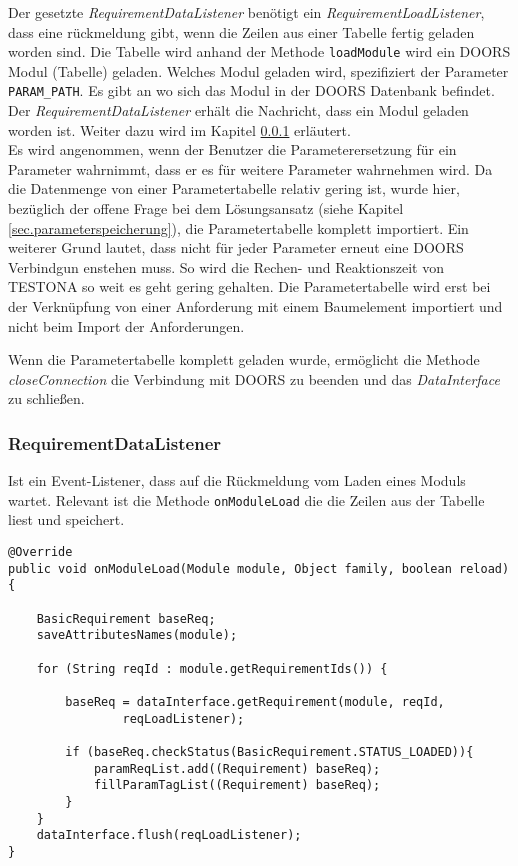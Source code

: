 Der gesetzte \textit{RequirementDataListener} benötigt ein \textit{RequirementLoadListener}, dass eine rückmeldung gibt, wenn die Zeilen aus einer Tabelle fertig geladen worden sind. Die Tabelle wird anhand der Methode \texttt{loadModule} wird ein DOORS Modul (Tabelle) geladen. Welches Modul geladen wird, spezifiziert der Parameter \texttt{PARAM\_PATH}. Es gibt an wo sich das Modul in der DOORS Datenbank befindet. Der \textit{RequirementDataListener} erhält die Nachricht, dass ein Modul geladen worden ist. Weiter dazu wird im Kapitel \ref{sub.RequirementDataListener} erläutert.\\


Es wird angenommen, wenn der Benutzer die Parameterersetzung für ein Parameter wahrnimmt, dass er es für weitere Parameter wahrnehmen wird. Da die Datenmenge von einer Parametertabelle relativ gering ist, wurde hier, bezüglich der offene Frage bei dem Lösungsansatz (siehe Kapitel \ref{sec.parameterspeicherung}), die Parametertabelle komplett importiert. 
Ein weiterer Grund lautet, dass nicht für jeder Parameter erneut eine DOORS Verbindgun enstehen muss. So wird die Rechen- und Reaktionszeit von TESTONA so weit es geht gering gehalten. Die Parametertabelle wird erst bei der Verknüpfung von einer Anforderung mit einem Baumelement importiert und nicht beim Import der Anforderungen. 

Wenn die Parametertabelle komplett geladen wurde, ermöglicht die Methode \textit{closeConnection} die Verbindung mit DOORS zu beenden und das \textit{DataInterface} zu schließen.





\subsubsection{RequirementDataListener}\label{sub.RequirementDataListener}

Ist ein Event-Listener, dass auf die Rückmeldung vom Laden eines Moduls wartet. Relevant ist die Methode \texttt{onModuleLoad} die die Zeilen aus der Tabelle liest und speichert.\\

\begin{lstlisting}[caption={Laden der Parametertabelle nach Zeilen}, captionpos=b]
@Override
public void onModuleLoad(Module module, Object family, boolean reload){

	BasicRequirement baseReq;
	saveAttributesNames(module);
				
	for (String reqId : module.getRequirementIds()) {

		baseReq = dataInterface.getRequirement(module, reqId,
				reqLoadListener);

		if (baseReq.checkStatus(BasicRequirement.STATUS_LOADED)){
			paramReqList.add((Requirement) baseReq);
			fillParamTagList((Requirement) baseReq);
		}
	}
	dataInterface.flush(reqLoadListener);
}
\end{lstlisting}

